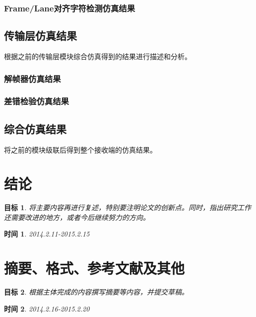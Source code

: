 \documentclass[UTF8]{ctexart}
\newtheorem{aim}{目标}
\newtheorem{deadline}{时间}
\begin{document}
\subsubsection{Frame/Lane对齐字符检测仿真结果}

\subsection{传输层仿真结果}
根据之前的传输层模块综合仿真得到的结果进行描述和分析。
\subsubsection{解帧器仿真结果}
\subsubsection{差错检验仿真结果}

\subsection{综合仿真结果}
将之前的模块级联后得到整个接收端的仿真结果。

\section{结论}

\begin{aim}{}将主要内容再进行复述，特别要注明论文的创新点。同时，指出研究工作还需要改进的地方，或者今后继续努力的方向。\end{aim}
\begin{deadline}{}2014.2.11-2015.2.15\end{deadline}

\section{摘要、格式、参考文献及其他}

\begin{aim}{}根据主体完成的内容撰写摘要等内容，并提交草稿。\end{aim}
\begin{deadline}{}2014.2.16-2015.2.20\end{deadline}
\end{document}
